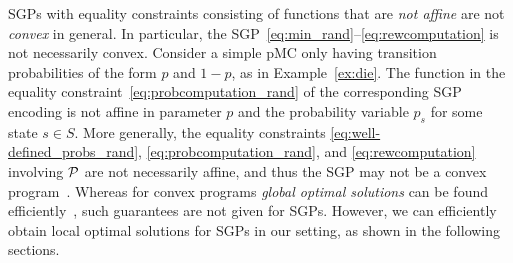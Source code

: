 SGPs with equality constraints consisting of functions that are \emph{not affine} are not \emph{convex} in general. 
In particular, the SGP~\eqref{eq:min_rand}--\eqref{eq:rewcomputation} is not necessarily convex. Consider a simple pMC only having transition probabilities of the form $p$ and $1-p$, as in Example~\ref{ex:die}. The function in the equality
constraint~\eqref{eq:probcomputation_rand} of the corresponding SGP encoding is not affine in
parameter $p$ and the probability variable $p_s$ for some state $s\in S$.
More generally, the equality constraints
\eqref{eq:well-defined_probs_rand},
\eqref{eq:probcomputation_rand}, and
\eqref{eq:rewcomputation}
involving $\mathcal{P}$ are not necessarily affine, and thus the SGP may not be a convex program~\cite{boyd_convex_optimization}.
Whereas for convex programs \emph{global optimal solutions} can be
found efficiently~\cite{boyd_convex_optimization}, such guarantees are
not given for SGPs. 
However, we can efficiently obtain local optimal solutions for SGPs in our setting, as shown in the following sections.




